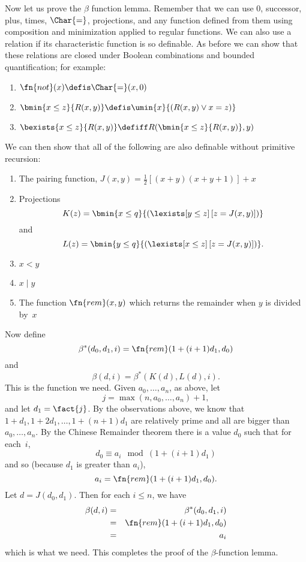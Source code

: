 \documentclass[../../../include/open-logic-section]{subfiles}
\begin{document}
Now let us prove the $\beta$ function lemma. Remember that we can use
$0$, successor, plus, times, $\Char{=}$, projections, and any function
defined from them using composition and minimization applied to
regular functions. We can also use a relation if its characteristic
function is so definable. As before we can show that these relations
are closed under Boolean combinations and bounded quantification; for
example:
\begin{enumerate}
\item $\fn{not}(x) \defis \Char{=}(x,0)$
\item $\bmin{x \leq z}{R(x,y)} \defis \umin{x}{(R(x,y) \lor x = z)}$
\item $\bexists{x \leq z}{R(x,y)} \defiff R(\bmin{x \leq z}{R(x,y)}, y)$
\end{enumerate}
We can then show that all of the following are also definable without
primitive recursion:
\begin{enumerate}
\item The pairing function, $J(x,y) = \frac{1}{2}[(x+y)(x+y+1)] + x$
\item Projections
\[
K(z) = \bmin{x \leq q}{(\lexists[y \leq z] \, [z = J(x,y)])}
\]
and
\[
L(z) = \bmin{y \leq q}{(\lexists[x \leq z]\, [z = J(x,y)])}.
\]
\item $x < y$
\item $x \mid y$
\item The function $\fn{rem}(x,y)$ which returns the remainder when
  $y$ is divided by~$x$
\end{enumerate}
Now define
\[
\beta^*(d_0,d_1,i) = \fn{rem}(1+(i+1) d_1,d_0)
\]
and
\[
\beta(d,i) = \beta^*(K(d),L(d),i).
\]
This is the function we need. Given $a_0,\dots,a_n$, as above, let
\[
j = \max(n,a_0,\dots,a_n)+1,
\]
and let $d_1 = \fact{j}$. By the observations above, we know that $1+d_1,
1+2 d_1, \dots, 1+(n+1) d_1$ are relatively prime and all are bigger
than $a_0,\dots,a_n$. By the Chinese Remainder theorem there is a
value $d_0$ such that for each~$i$,
\[
d_0 \equiv a_i \mod (1+(i+1)d_1)
\]
and so (because $d_1$ is greater than $a_i$),
\[
a_i = \fn{rem}(1+(i+1)d_1,d_0).
\]
Let $d = J(d_0,d_1)$. Then for each $i \le n$, we have
\begin{eqnarray*}
\beta(d,i) & = & \beta^*(d_0,d_1,i) \\
& = & \fn{rem}(1+(i+1) d_1,d_0) \\
& = & a_i
\end{eqnarray*}
which is what we need. This completes the proof of the
$\beta$-function lemma.
\end{document}
